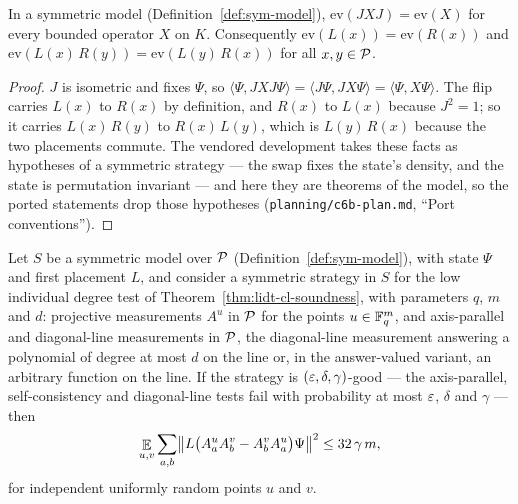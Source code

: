 \begin{lemma}
\label{lem:sym-model-swap}
\leanok
In a symmetric model (Definition~\ref{def:sym-model}), $\mathrm{ev}(J X J) = \mathrm{ev}(X)$ for
every bounded operator $X$ on $K$. Consequently $\mathrm{ev}(L(x)) = \mathrm{ev}(R(x))$ and
$\mathrm{ev}(L(x)\, R(y)) = \mathrm{ev}(L(y)\, R(x))$ for all $x, y \in \cal{P}$.
\end{lemma}

\begin{proof}
\leanok
$J$ is isometric and fixes $\Psi$, so $\langle \Psi, J X J \Psi \rangle = \langle J \Psi, J X \Psi
\rangle = \langle \Psi, X \Psi \rangle$. The flip carries $L(x)$ to $R(x)$ by definition, and $R(x)$
to $L(x)$ because $J^2 = 1$; so it carries $L(x)\, R(y)$ to $R(x)\, L(y)$, which is $L(y)\, R(x)$
because the two placements commute. The vendored development takes these facts as hypotheses of a
symmetric strategy --- the swap fixes the state's density, and the state is permutation invariant
--- and here they are theorems of the model, so the ported statements drop those hypotheses
(\texttt{planning/c6b-plan.md}, ``Port conventions'').
\end{proof}

\begin{lemma}
\label{lem:co-commutativity-points}
\leanok
Let $S$ be a symmetric model over $\cal{P}$ (Definition~\ref{def:sym-model}), with state $\Psi$
and first placement $L$, and consider a symmetric strategy in $S$ for the low individual degree
test of Theorem~\ref{thm:lidt-cl-soundness}, with parameters $q$, $m$ and $d$: projective
measurements $A^u$ in $\cal{P}$ for the points $u \in \Fq^m$, and axis-parallel and diagonal-line
measurements in $\cal{P}$, the diagonal-line measurement answering a polynomial of degree at
most $d$ on the line or, in the answer-valued variant, an arbitrary function on the line. If the
strategy is $(\eps, \delta, \gamma)$-good --- the axis-parallel, self-consistency and diagonal-line
tests fail with probability at most $\eps$, $\delta$ and $\gamma$ --- then
\[
  \E_{u, v} \sum_{a, b} \bigl\| L\bigl(A^u_a A^v_b - A^v_b A^u_a\bigr) \Psi \bigr\|^2 \leq 32\,
  \gamma\, m,
\]
for independent uniformly random points $u$ and $v$.
\end{lemma}

